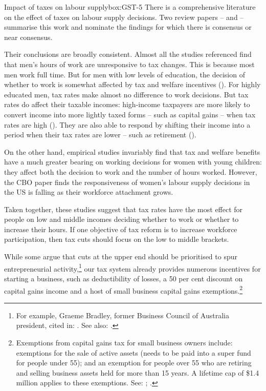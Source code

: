 \documentclass{grattanAlpha}
\begin{document}
\begin{smallbox}{Impact of taxes on labour supply}{box:GST-5}
There is a comprehensive literature on the effect of taxes on labour supply decisions. Two review papers – \textcite{MeghirPhillips2008} and \textcite{CBO-2012-Labor-Supply-Elasticity} \textcite{CBO-2012-Labor-Supply-Elasticity} – summarise this work and nominate the findings for which there is consensus or near consensus.

Their conclusions are broadly consistent. Almost all the studies referenced find that men’s hours of work are unresponsive to tax changes. This is because most men work full time. But for men with low levels of education, the decision of whether to work is somewhat affected by tax and welfare incentives (\textcite{MeghirPhillips2008}). For highly educated men, tax rates make almost no difference to work decisions. But tax rates do affect their taxable incomes: high-income taxpayers are more likely to convert income into more lightly taxed forms – such as capital gains – when tax rates are high (\textcite{MeghirPhillips2008}). They are also able to respond by shifting their income into a period when their tax rates are lower – such as retirement (\textcite{CBO-2012-Labor-Supply-Elasticity}).

On the other hand, empirical studies invariably find that tax and welfare benefits have a much greater bearing on working decisions for women with young children: they affect both the decision to work and the number of hours worked. However, the CBO paper finds the responsiveness of women’s labour supply decisions in the US is falling as their workforce attachment grows.

Taken together, these studies suggest that tax rates have the most effect for people on low and middle incomes deciding whether to work or whether to increase their hours. If one objective of tax reform is to increase workforce participation, then tax cuts should focus on the low to middle brackets.

\end{smallbox}


While some argue that cuts at the upper end should be prioritised to spur entrepreneurial activity,\footnote{For example, Graeme Bradley, former Business Council of Australia president, cited in: \textcite{BaloghHepworth2015}. See also: \textcite{Hockey2015d}.}  our tax system already provides numerous incentives for starting a business, such as deductibility of losses, a 50 per cent discount on capital gains income and a host of small business capital gains exemptions.\footnote{Exemptions from capital gains tax for small business owners include: 
 exemptions for the sale of active assets (needs to be paid into a super fund for people under 55); and an exemption for people over 55 who are retiring and selling business assets held for more than 15 years. A lifetime cap of \$1.4 million applies to these exemptions. See: \textcite{ATO2014f}; \textcite[][57]{DaleyCoatesWoodEtAl2015Super}.
}  
\end{document}
